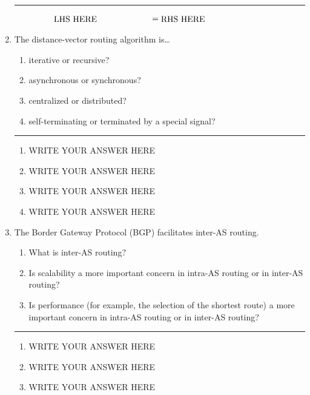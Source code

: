 \documentclass[twoside]{article}
\newenvironment{answer}
  {\vspace*{0.2cm} \rule{12cm}{0.04cm} \vspace*{0.2cm}}
  {\vspace*{0.2cm}}
\begin{document}
\begin{enumerate}
  \begin{answer}

  \begin{align*}
    \parbox{4cm}{LHS HERE} & = \parbox{4cm}{RHS HERE}
    \end{align*}

    \end{answer}

  \item The distance-vector routing algorithm is\ldots
  \begin{enumerate}
    \item iterative or recursive?
    \item asynchronous or synchronous?
    \item centralized or distributed?
    \item self-terminating or terminated by a special signal?
    \end{enumerate}

  \begin{answer}

  \begin{enumerate}
    \item WRITE YOUR ANSWER HERE
    \item WRITE YOUR ANSWER HERE
    \item WRITE YOUR ANSWER HERE
    \item WRITE YOUR ANSWER HERE
    \end{enumerate}

    \end{answer}

  \item The Border Gateway Protocol (BGP) facilitates inter-AS routing.
  \begin{enumerate}
    \item What is inter-AS routing?
    \item Is scalability a more important concern in intra-AS routing
      or in inter-AS routing?
    \item Is performance (for example, the selection of the shortest
      route) a more important concern in intra-AS routing or
      in inter-AS routing?
    \end{enumerate}

  \begin{answer}

  \begin{enumerate}
    \item WRITE YOUR ANSWER HERE 
    \item WRITE YOUR ANSWER HERE 
    \item WRITE YOUR ANSWER HERE 
    \end{enumerate}


\end{answer}
\end{enumerate}
\end{document}
